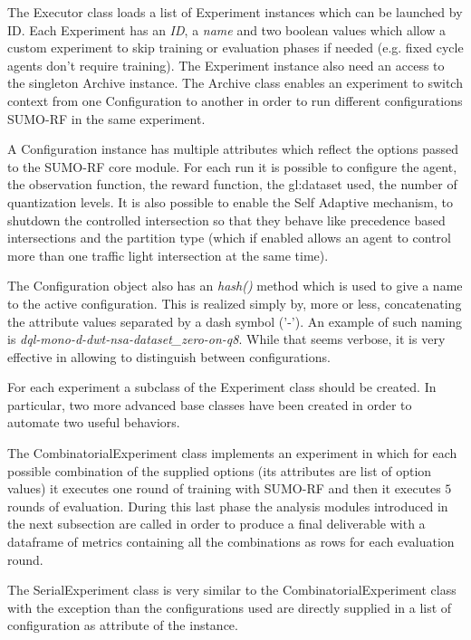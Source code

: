 The Executor class loads a list of Experiment instances which can be launched by ID.
Each Experiment has an \textit{ID}, a \textit{name} and two boolean values which allow a custom experiment to skip training or evaluation phases if needed (e.g. fixed cycle agents don't require training).
The Experiment instance also need an access to the singleton Archive instance.
The Archive class enables an experiment to switch context from one Configuration to another in order to run different configurations SUMO-RF in the same experiment.

A Configuration instance has multiple attributes which reflect the options passed to the SUMO-RF core module.
For each run it is possible to configure the agent, the observation function, the reward function, the \gls{gl:dataset} used, the number of quantization levels.
It is also possible to enable the Self Adaptive mechanism, to shutdown the controlled intersection so that they behave like precedence based intersections and the partition type (which if enabled allows an agent to control more than one traffic light intersection at the same time).

The Configuration object also has an \textit{hash()} method which is used to give a name to the active configuration.
This is realized simply by, more or less, concatenating the attribute values separated by a dash symbol ('-').
An example of such naming is \textit{dql-mono-d-dwt-nsa-dataset\_zero-on-q8}.
While that seems verbose, it is very effective in allowing to distinguish between configurations.

For each experiment a subclass of the Experiment class should be created.
In particular, two more advanced base classes have been created in order to automate two useful behaviors.

The CombinatorialExperiment class implements an experiment in which for each possible combination of the supplied options (its attributes are list of option values) it executes one round of training with SUMO-RF and then it executes $5$ rounds of evaluation.
During this last phase the analysis modules introduced in the next subsection are called in order to produce a final deliverable with a dataframe of metrics containing all the combinations as rows for each evaluation round.

The SerialExperiment class is very similar to the CombinatorialExperiment class with the exception than the configurations used are directly supplied in a list of configuration as attribute of the instance.

